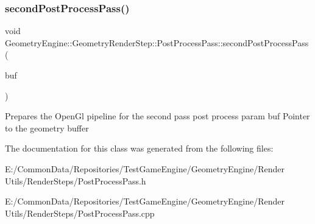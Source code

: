 \subsubsection{\texorpdfstring{secondPostProcessPass()}{secondPostProcessPass()}}
{\footnotesize\ttfamily void Geometry\+Engine\+::\+Geometry\+Render\+Step\+::\+Post\+Process\+Pass\+::second\+Post\+Process\+Pass (\begin{DoxyParamCaption}\item[{\mbox{\hyperlink{class_geometry_engine_1_1_geometry_buffer_1_1_g_buffer}{Geometry\+Buffer\+::\+G\+Buffer}} $\ast$}]{buf }\end{DoxyParamCaption})\hspace{0.3cm}{\ttfamily [protected]}}

Prepares the Open\+Gl pipeline for the second pass post process param buf Pointer to the geometry buffer 

The documentation for this class was generated from the following files\+:\begin{DoxyCompactItemize}
\item 
E\+:/\+Common\+Data/\+Repositories/\+Test\+Game\+Engine/\+Geometry\+Engine/\+Render Utils/\+Render\+Steps/Post\+Process\+Pass.\+h\item 
E\+:/\+Common\+Data/\+Repositories/\+Test\+Game\+Engine/\+Geometry\+Engine/\+Render Utils/\+Render\+Steps/Post\+Process\+Pass.\+cpp\end{DoxyCompactItemize}
